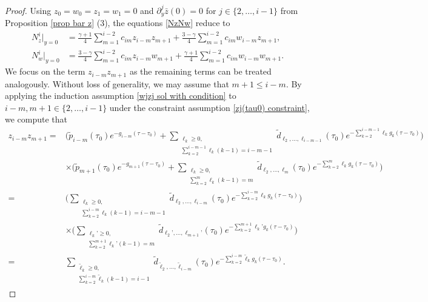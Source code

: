 \documentclass{article}
\newcommand{\ga}{\gamma}
\newcommand{\pa}{\partial}
\numberwithin{equation}{section}
\begin{document}
\begin{proof}
        Using $z_0=w_0=z_1=w_1=0$ and $\pa_y^j \bar z(0)=0$ for $j\in\{2,\dots, i-1\}$ from Proposition \ref{prop bar z} (3), the equations \eqref{NzNw} reduce to 
        \begin{align*}
             N_z^i|_{y=0}&=\frac{\ga+1}{4}\sum_{m=1}^{i-2}c_{im}  z_{i-m}  z_{m+1} + \frac{3-\ga}{4}\sum_{m=1}^{i-2}c_{im} w_{i-m}  z_{m+1},\\
    N_w^i|_{y=0}&= \frac{3-\ga}{4}\sum_{m=1}^{i-2}c_{im}  z_{i-m}  w_{m+1} + \frac{\ga+1}{4}\sum_{m=1}^{i-2}c_{im}  w_{i-m} w_{m+1}.
        \end{align*}
        We focus on the term $z_{i-m}z_{m+1}$ as 
        the remaining terms can be treated analogously.
        Without loss of generality, we may assume that $m+1\leq i-m$. 
        By applying the induction assumption 
        \eqref{wjzj sol with condition} to $i-m, m+1\in\{2,\dots, i-1\}$ under the constraint assumption \eqref{zj(tau0) constraint}, we compute that
        \begin{align*}
            z_{i-m}z_{m+1} = &\Big(\tilde p_{i-m}(\tau_0)e^{-g_{i-m}(\tau-\tau_0)} + \sum_{\substack{\ell_k\geq 0,\\ \sum_{ k=2}^ { i-m-1} \ell_k (k-1) = i-m-1 }} \tilde d_{ \ell_2,\dots, \ell_{i-m-1}}(\tau_0)  %
       e^{-\sum_{ k=2}^ { i-m-1}\ell_k g_k(\tau-\tau_0)}\Big)\\
       &\times \Big(\tilde p_{m+1}(\tau_0)e^{-g_{m+1}(\tau-\tau_0)} + \sum_{\substack{\ell_k\geq 0,\\ \sum_{ k=2}^ { m} \ell_k (k-1) = m }} \tilde d_{ \ell_2,\dots, \ell_{m}}(\tau_0)  %
       e^{-\sum_{ k=2}^ { m}\ell_k g_k(\tau-\tau_0)}\Big)\\
       =&\Big(  \sum_{\substack{\ell_k\geq 0,\\ \sum_{ k=2}^ { i-m} \ell_k (k-1) = i-m-1 }} \tilde d_{ \ell_2,\dots, \ell_{i-m}}(\tau_0)  
       e^{-\sum_{ k=2}^ { i-m}\ell_k g_k(\tau-\tau_0)}\Big)\\
       &\times \Big(\sum_{\substack{\ell_k’\geq 0,\\ \sum_{ k=2}^ { m+1} \ell_k’(k-1) = m }} \tilde d_{ \ell_2’,\dots, \ell_{m+1}’}(\tau_0)  
       e^{-\sum_{ k=2}^ { m+1}\ell_k’ g_k(\tau-\tau_0)}\Big)\\
       =&\sum_{\substack{\tilde \ell_k\geq 0,\\ \sum_{ k=2}^ { i-m} \tilde \ell_k (k-1) = i-1 }} \tilde d_{ \tilde \ell_2,\dots, \tilde\ell_{i-m}}(\tau_0)  e^{-\sum_{ k=2}^ { i-m}\tilde  \ell_k g_k(\tau-\tau_0)}.
       \end{align*}
        

\end{proof}
\end{document}
